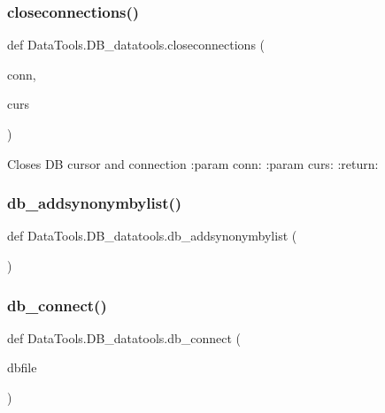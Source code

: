 \subsubsection{\texorpdfstring{closeconnections()}{closeconnections()}}
{\footnotesize\ttfamily def Data\+Tools.\+D\+B\+\_\+datatools.\+closeconnections (\begin{DoxyParamCaption}\item[{}]{conn,  }\item[{}]{curs }\end{DoxyParamCaption})}

\begin{DoxyVerb}Closes DB cursor and connection
:param conn:
:param curs:
:return:
\end{DoxyVerb}
 \mbox{\label{namespace_data_tools_1_1_d_b__datatools_a1212712fcf953f4da8f4f9305eb4f1a7}} 
\subsubsection{\texorpdfstring{db\+\_\+addsynonymbylist()}{db\_addsynonymbylist()}}
{\footnotesize\ttfamily def Data\+Tools.\+D\+B\+\_\+datatools.\+db\+\_\+addsynonymbylist (\begin{DoxyParamCaption}{ }\end{DoxyParamCaption})}

\mbox{\label{namespace_data_tools_1_1_d_b__datatools_a439f619ddb9436e2d169bc1ffdd44f53}} 
\subsubsection{\texorpdfstring{db\+\_\+connect()}{db\_connect()}}
{\footnotesize\ttfamily def Data\+Tools.\+D\+B\+\_\+datatools.\+db\+\_\+connect (\begin{DoxyParamCaption}\item[{}]{dbfile }\end{DoxyParamCaption})}

